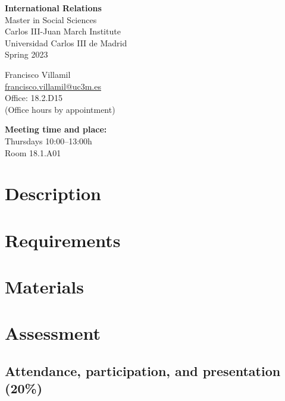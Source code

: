 \documentclass[12pt, a4paper]{article}
\begin{document}
\begin{center}
{\LARGE\bf International Relations}\\\vspace{10pt}
Master in Social Sciences\\
Carlos III-Juan March Institute\\Universidad Carlos III de Madrid\\\vspace{10pt}
{\large Spring 2023}\\
\end{center}

\vspace{20pt}

\begin{minipage}{0.49\textwidth}
Francisco Villamil\\
\href{francisco.villamil@uc3m.es}{francisco.villamil@uc3m.es}\\
Office: 18.2.D15\\(Office hours by appointment)\\
\end{minipage}\hfill
\begin{minipage}{0.49\textwidth}
\centering
\textbf{Meeting time and place:}\\
Thursdays 10:00--13:00h\\Room 18.1.A01\\
\end{minipage}


\vspace{10pt}
\section{Description}

\section{Requirements}

\section{Materials}


\section{Assessment}


\subsection*{Attendance, participation, and presentation (20\%)}
\end{document}
